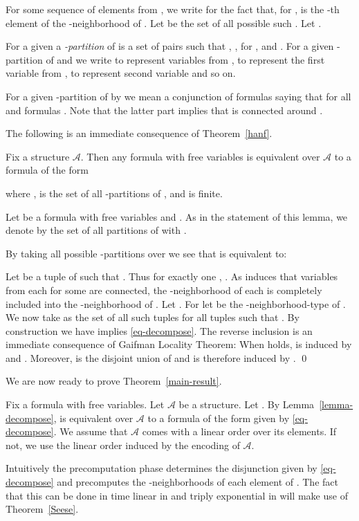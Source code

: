 \documentclass{LMCS}
\newcommand\cA{\ensuremath{{\mathcal A}}\xspace}
\begin{document}
For some sequence  of  elements from
, we write  for the fact that, for
,  is the
-th element of the -neighborhood of . Let  be the
set of all possible such . Let .

For a given  a \emph{-partition} of 
is a set of pairs  such that
, ,   for
, and . For a given -partition  of  and
 we write  to represent variables from
,  to represent the first variable from ,  to represent second
variable and so on.

For a given -partition 
of  by  we mean a conjunction of formulas
saying that  for all
 and formulas .
Note that the latter part implies that  is connected around .

The following is an immediate consequence of
Theorem~\ref{hanf}.

\begin{lem}\label{lemma-decompose}
  Fix a structure \cA.  Then any formula  with  free variables
  is equivalent over \cA to a formula of the form
  
where ,  is the set of all -partitions of , 
and  is finite.
\end{lem}

\proof
Let  be a formula with  free variables and .
As in the statement of this lemma, we denote by  the set of all partitions
 of  with .

By taking all possible -partitions over  we see that
 is equivalent to:


Let  be a tuple of  such that . Thus for
exactly one , .  As  induces that variables from each  for
some  are connected, the -neighborhood of each 
is completely included into the -neighborhood of . Let
. For  let  be the -neighborhood-type of
. We now take  as the set of all such tuples  for all tuples  such that . By construction we have  implies
\eqref{eq-decompose}. The reverse inclusion is an immediate consequence of
Gaifman Locality Theorem: When  holds,  is
induced by  and . Moreover,  is the
disjoint union of  and is therefore induced by . \qed

\medskip
We are now ready to prove Theorem~\ref{main-result}.
\medskip

 Fix a formula  with
 free variables. Let \cA be a structure. Let . By
Lemma~\ref{lemma-decompose},  is equivalent over \cA to a formula
of the form given by \eqref{eq-decompose}.  We assume that \cA comes with a
linear order over its elements. If not, we use the linear order induced by the
encoding of \cA.

  Intuitively the precomputation phase determines the disjunction given by
  \eqref{eq-decompose} and precomputes the
  -neighborhoods of each element of . The fact that this can be done
  in time linear in  and triply exponential in  will make use
  of Theorem~\ref{Seese}.
\end{document}
